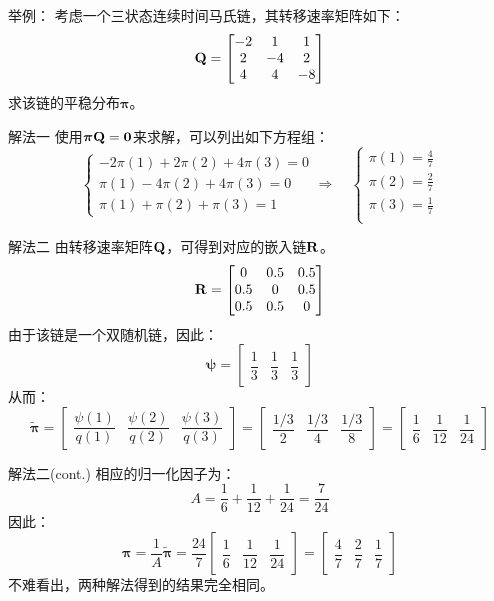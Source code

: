 \documentclass[t]{beamer}
\begin{document}
\begin{frame}{举例：}
  考虑一个三状态连续时间马氏链，其转移速率矩阵如下：
	\[{\bf Q}=\begin{bmatrix}
	-2 & 1 &1\\
	2 & -4 &2\\
	4 & 4 &-8\\
	\end{bmatrix} \]
	求该链的平稳分布$\bm{\pi}$。
\end{frame}




\begin{frame}{解法一}
  使用${\bm{\pi}}{\bf Q}={\bf 0}$来求解，可以列出如下方程组：
	\[\begin{cases}
	-2\pi(1)+2\pi(2)+4\pi(3)=0\\
	\pi(1)-4\pi(2)+4\pi(3)=0\\
	\pi(1)+\pi(2)+\pi(3)=1
	\end{cases}\Rightarrow\quad \begin{cases}
	\pi(1)=\frac{4}{7}\\
 	\pi(2)=\frac{2}{7}\\
	\pi(3)=\frac{1}{7}\\
	\end{cases} \]
\end{frame}


\begin{frame}{解法二}
  由转移速率矩阵${\bf Q}$，可得到对应的嵌入链${\bf R}$。
	\[{\bf R}=\begin{bmatrix}
	0 & 0.5 & 0.5\\
	0.5 & 0 & 0.5\\
	0.5 & 0.5 & 0\\
	\end{bmatrix} \]
	由于该链是一个双随机链，因此：$$\bm{\psi}=\begin{bmatrix}
	\dfrac{1}{3}&\dfrac{1}{3}&\dfrac{1}{3}
	\end{bmatrix}$$
从而：
	\[\widetilde{\bm{\pi}}=\begin{bmatrix}
	\dfrac{\psi(1)}{q(1)} & \dfrac{\psi(2)}{q(2)} & \dfrac{\psi(3)}{q(3)}
	\end{bmatrix}=\begin{bmatrix}
		\dfrac{1/3}{2}&\dfrac{1/3}{4}&\dfrac{1/3}{8}
	\end{bmatrix}=\begin{bmatrix}
		\dfrac{1}{6} & \dfrac{1}{12} & \dfrac{1}{24}
  \end{bmatrix} \]
\end{frame}


\begin{frame}{解法二(cont.)}
  相应的归一化因子为：
	\[A= \frac{1}{6}+\frac{1}{12}+\frac{1}{24}=\frac{7}{24} \]
	因此：
	\[\bm{\pi}=\frac{1}{A}\widetilde{\bm{\pi}}=\frac{24}{7}\begin{bmatrix}
		\dfrac{1}{6} & \dfrac{1}{12} & \dfrac{1}{24}
		\end{bmatrix}=\begin{bmatrix}
		\dfrac{4}{7} & \dfrac{2}{7} & \dfrac{1}{7}
		\end{bmatrix} \]
	不难看出，两种解法得到的结果完全相同。
\end{frame}
\end{document}
